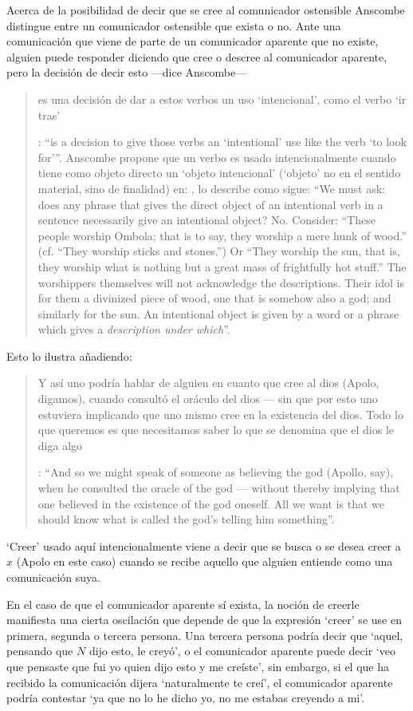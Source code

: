 Acerca de la posibilidad de decir que se cree al comunicador ostensible Anscombe distingue entre un comunicador ostensible que exista o no. Ante una comunicación que viene de parte de un comunicador aparente que no existe, alguien puede responder diciendo que cree o descree al comunicador aparente, pero la decisión de decir esto ---dice Anscombe--- \blockquote[{\Cite[7]{anscombe2008faith:tobelieve}}: \enquote{is a decision to give those verbs an `intentional' use like the verb `to look for'}. Anscombe propone que un verbo es usado intencionalmente cuando tiene como objeto directo un `objeto intencional' (`objeto' no en el sentido material, sino de finalidad) en: {\cite[9]{anscombe1981metaphysics:intsens}, lo describe como sigue: \enquote{We must ask: does any phrase that gives the direct object of an intentional verb in a sentence necessarily give an intentional object? No. Consider: ``These people worship Ombola; that is to say, they worship a mere hunk of wood.'' (cf. ``They worship sticks and stones.'') Or ``They worship the sun, that is, they worship what is nothing but a great mass of frightfully hot stuff.'' The worshippers themselves will not acknowledge the descriptions. Their idol is for them a divinized piece of wood, one that is somehow also a god; and similarly for the sun. An intentional object is given by a word or a phrase which gives a \emph{description under which}}}.]{es una decisión de dar a estos verbos un uso `intencional', como el verbo `ir tras'}. Esto lo ilustra añadiendo: \blockquote[{\Cite[7]{anscombe2008faith:tobelieve}}: \enquote{And so we might speak of someone as believing the god (Apollo, say), when he consulted the oracle of the god --- without thereby implying that one believed in the existence of the god oneself. All we want is that we should know what is called the god's telling him something}.]{Y así uno podría hablar de alguien en cuanto que cree al dios (Apolo, digamos), cuando consultó el oráculo del dios --- sin que por esto uno estuviera implicando que uno mismo cree en la existencia del dios. Todo lo que queremos es que necesitamos saber lo que se denomina que el dios le diga algo}. `Creer' usado aquí intencionalmente viene a decir que se busca o se desea creer a $x$ (Apolo en este caso) cuando se recibe aquello que alguien entiende como una comunicación suya.

En el caso de que el comunicador aparente sí exista, la noción de creerle manifiesta una cierta oscilación que depende de que la expresión `creer' se use en primera, segunda o tercera persona. Una tercera persona podría decir que \enquote*{aquel, pensando que $N$ dijo esto, le creyó}, o el comunicador aparente puede decir \enquote*{veo que pensaste que fui yo quien dijo esto y me creíste}, sin embargo, si el que ha recibido la comunicación dijera \enquote*{naturalmente te creí}, el comunicador aparente podría contestar \enquote*{ya que no lo he dicho yo, no me estabas creyendo a mi}.

